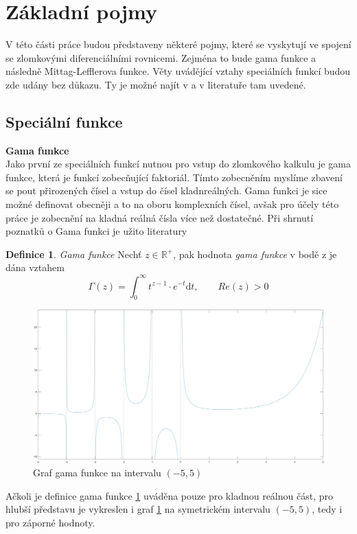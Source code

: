 \documentclass[a4paper,12pt,twoside]{article}
\theoremstyle{definition}
\newtheorem{defin}[veta]{Definice}
\theoremstyle{remark}
\numberwithin{equation}{section}
\numberwithin{table}{section}
\numberwithin{figure}{section}
\newcommand{\dx}[1]{\mathrm{d} #1}
\newcommand{\R}{\mathbb{R}}
\begin{document}
\section{Základní pojmy}
V této části práce budou představeny některé pojmy, které se vyskytují ve spojení se zlomkovými diferenciálními rovnicemi. Zejména to bude gama funkce a následně Mittag-Lefflerova funkce. Věty uvádějící vztahy speciálních funkcí budou zde udány bez důkazu. Ty je možné najít v \cite{Podlubny} a v literatuře tam uvedené.
\subsection{Speciální funkce}
\textbf{Gama funkce} \\
Jako první ze speciálních funkcí nutnou pro vstup do zlomkového kalkulu je gama funkce, která je funkcí zobecňující faktoriál. Tímto zobecněním myslíme zbavení se pout přirozených čísel a vstup do čísel kladnreálných. Gama funkci je sice možné definovat obecněji a to na oboru komplexních čísel, avšak pro účely této práce je zobecnění na kladná reálná čísla více než dostatečné.
Při shrnutí poznatků o Gama funkci je užito literatury \cite{Bashour}
 
\begin{defin}{\emph{Gama funkce}} \label{GammaFunkce}
	Nechť $z \in \R ^{+}$, pak hodnota \emph{gama funkce} v bodě z je dána vztahem
	$$
	\Gamma \left( z\right)  = \int_{0}^{ \infty } t^{z-1} \cdot e^{-t} \dx{t}, \qquad  Re\left( z\right)  > 0
	$$
\end{defin}


\begin{figure} [h!] 
	\caption{Graf gama funkce na  intervalu $\left(-5,5\right)$}
	\label{GrafGamma}
	\includegraphics[width=1\textwidth]{GammaFunction(-5,5).png}
\end{figure}
Ačkoli je definice gama funkce \ref{GammaFunkce} uváděna pouze pro  kladnou reálnou část, pro hlubší představu je vykreslen i graf \ref{GrafGamma} na symetrickém intervalu $\left(-5, 5\right)$, tedy i pro záporné hodnoty. 
\end{document}
